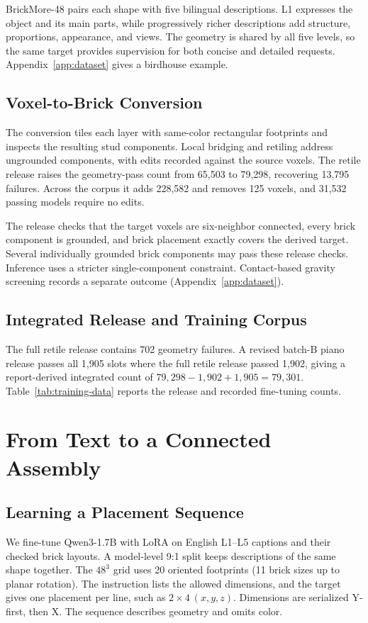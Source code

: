 BrickMore-48 pairs each shape with five bilingual descriptions. L1 expresses the object and its main parts, while progressively richer descriptions add structure, proportions, appearance, and views. The geometry is shared by all five levels, so the same target provides supervision for both concise and detailed requests. Appendix~\ref{app:dataset} gives a birdhouse example.

\subsection{Voxel-to-Brick Conversion}
The conversion tiles each layer with same-color rectangular footprints and inspects the resulting stud components. Local bridging and retiling address ungrounded components, with edits recorded against the source voxels. The retile release raises the geometry-pass count from 65,503 to 79,298, recovering 13,795 failures. Across the corpus it adds 228,582 and removes 125 voxels, and 31,532 passing models require no edits.

The release checks that the target voxels are six-neighbor connected, every brick component is grounded, and brick placement exactly covers the derived target. Several individually grounded brick components may pass these release checks. Inference uses a stricter single-component constraint. Contact-based gravity screening records a separate outcome (Appendix~\ref{app:dataset}).

\subsection{Integrated Release and Training Corpus}
The full retile release contains 702 geometry failures. A revised batch-B piano release passes all 1,905 slots where the full retile release passed 1,902, giving a report-derived integrated count of $79{,}298-1{,}902+1{,}905=79{,}301$. Table~\ref{tab:training-data} reports the release and recorded fine-tuning counts.




\section{From Text to a Connected Assembly}
\label{sec:model}
\subsection{Learning a Placement Sequence}
\label{sec:training}
We fine-tune Qwen3-1.7B with LoRA on English L1--L5 captions and their checked brick layouts. A model-level 9:1 split keeps descriptions of the same shape together. The $48^3$ grid uses 20 oriented footprints (11 brick sizes up to planar rotation). The instruction lists the allowed dimensions, and the target gives one placement per line, such as $2{\times}4\ (x,y,z)$. Dimensions are serialized Y-first, then X. The sequence describes geometry and omits color.

